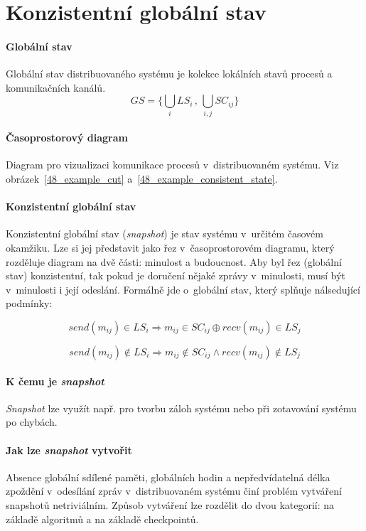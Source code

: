 
\section{Konzistentní globální stav}

\paragraph*{Globální stav} Globální stav distribuovaného systému je kolekce lokálních stavů procesů a komunikačních kanálů. $${\displaystyle
            GS = \Big\{ \bigcup_{i} LS_i \,,\, \bigcup_{i, j} SC_{ij} \Big\}
        }$$

\paragraph*{Časoprostorový diagram} Diagram pro vizualizaci komunikace procesů v~distribuovaném systému. Viz obrázek~\ref{48_example_cut} a~\ref{48_example_consistent_state}.

\paragraph*{Konzistentní globální stav} Konzistentní globální stav (\textit{\textit{snapshot}}) je stav systému v~určitém časovém okamžiku. Lze si jej představit jako řez v~časoprostorovém diagramu, který rozděluje diagram na dvě části: minulost a budoucnost. Aby byl řez (globální stav) konzistentní, tak pokud je doručení nějaké zprávy v~minulosti, musí být v~minulosti i její odeslání. Formálně jde o~globální stav, který splňuje nálsedující podmínky:

$${\displaystyle
            send(m_{ij}) \in LS_i \Rightarrow m_{ij} \in SC_{ij} \oplus recv(m_{ij}) \in LS_j
        }$$

$${\displaystyle
            send(m_{ij}) \not\in LS_i \Rightarrow m_{ij} \not\in SC_{ij} \land recv(m_{ij}) \not\in LS_j
        }$$

\paragraph*{K čemu je \textit{\textit{snapshot}}} \textit{Snapshot} lze využít např. pro tvorbu záloh systému nebo při zotavování systému po chybách.

\paragraph*{Jak lze \textit{\textit{snapshot}} vytvořit} Absence globální sdílené paměti, globálních hodin a nepředvídatelná délka zpoždění v~odesílání zpráv v~distribuovaném systému činí problém vytváření snapshotů netriviálním. Způsob vytváření lze rozdělit do dvou kategorií: na základě algoritmů a na základě checkpointů.

